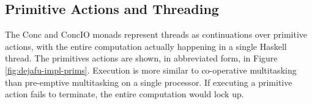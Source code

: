 \subsection*{Primitive Actions and Threading}
\label{sec:dejafu-impl-prims}

The Conc and ConcIO monads represent threads as continuations over
primitive actions, with the entire computation actually happening in a
single Haskell thread. The primitives actions are shown, in
abbreviated form, in Figure \ref{fig:dejafu-impl-prims}. Execution is
more similar to co-operative multitasking than pre-emptive
multitasking on a single processor. If executing a primitive action
fails to terminate, the entire computation would lock up.

\begin{figure}[t]
  \centering
%


\end{figure}

